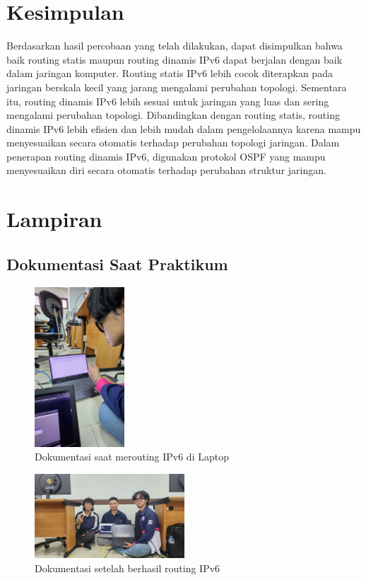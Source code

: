 \section{Kesimpulan}
Berdasarkan hasil percobaan yang telah dilakukan, dapat disimpulkan bahwa baik routing statis maupun routing dinamis IPv6 dapat berjalan dengan baik dalam jaringan komputer. Routing statis IPv6 lebih cocok diterapkan pada jaringan berskala kecil yang jarang mengalami perubahan topologi. Sementara itu, routing dinamis IPv6 lebih sesuai untuk jaringan yang luas dan sering mengalami perubahan topologi. Dibandingkan dengan routing statis, routing dinamis IPv6 lebih efisien dan lebih mudah dalam pengelolaannya karena mampu menyesuaikan secara otomatis terhadap perubahan topologi jaringan. Dalam penerapan routing dinamis IPv6, digunakan protokol OSPF yang mampu menyesuaikan diri secara otomatis terhadap perubahan struktur jaringan.

\section{Lampiran}
\subsection{Dokumentasi Saat Praktikum}
\begin{figure}[H]
    \centering
    \includegraphics[width=0.3\textwidth]{P2/img/dokum1.jpg}
    \caption{Dokumentasi saat merouting IPv6 di Laptop}
    \label{fig:labelgambar}
\end{figure}
\begin{figure}[H]
    \centering
    \includegraphics[width=0.5\textwidth]{P2/img/dokum2.jpg}
    \caption{Dokumentasi setelah berhasil routing IPv6}
    \label{fig:labelgambar}
\end{figure}